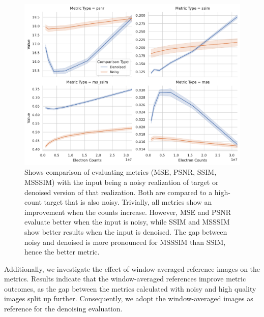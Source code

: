 \begin{figure}
    \centering
    \includegraphics[width=1\linewidth]{images/metrics_comparison_denoised_noisy.pdf}
    \caption{Shows comparison of evaluating metrics (\gls{MSE}, \gls{PSNR}, \gls{SSIM}, \gls{MSSSIM}) with the input being a noisy realization of target or denoised version of that realization. Both are compared to a high-count target that is also noisy. Trivially, all metrics show an improvement when the counts increase. However, \gls{MSE} and \gls{PSNR} evaluate better when the input is noisy, while \gls{SSIM} and \gls{MSSSIM} show better results when the input is denoised. The gap between noisy and denoised is more pronounced for \gls{MSSSIM} than \gls{SSIM}, hence the better metric. }
   \label{fig:metrics-comparison}
\end{figure}

Additionally, we investigate the effect of window-averaged reference images on the metrics. Results indicate that the window-averaged references improve metric outcomes, as the gap between the metrics calculated with noisy and high quality images split up further. Consequently, we adopt the window-averaged images as reference for the denoising evaluation.


